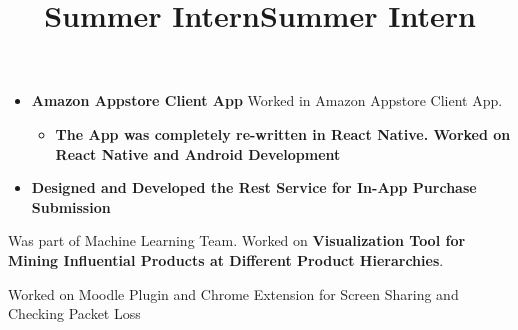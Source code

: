 \begin{resume}
\begin{position}
\begin{itemize}
\item \textbf{Amazon Appstore Client App} Worked in Amazon Appstore Client App. 

\begin{itemize}
    \item \textbf{The App was completely re-written in React Native. Worked on React Native and Android Development }
\end{itemize}

\item \textbf{Designed and Developed the Rest Service for In-App Purchase Submission}

\end{itemize}
\end{position}


\title{Summer Intern}
\begin{position}
Was part of Machine Learning Team. Worked on \textbf{Visualization Tool for Mining
Influential Products at Different Product Hierarchies}.
\end{position}

\title{Summer Intern}
\begin{position}
Worked on Moodle Plugin and Chrome Extension for Screen Sharing and Checking Packet Loss
\end{position}









\end{resume}
